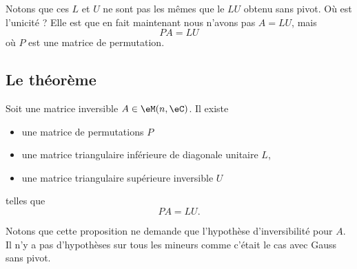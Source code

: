 Notons que ces \( L\) et \( U\) ne sont pas les mêmes que le \( L U\) obtenu sans pivot. Où est l'unicité ? Elle est que en fait maintenant nous n'avons pas \( A=LU\), mais
\begin{equation}
    PA=LU
\end{equation}
où \( P\) est une matrice de permutation.

\subsection{Le théorème}

\begin{proposition}       \label{PROPooGCPAooDrlrGu}
    Soit une matrice inversible \( A\in\eM(n,\eC)\). Il existe
    \begin{itemize}
        \item une matrice de permutations \( P\)
        \item une matrice triangulaire inférieure de diagonale unitaire \( L\),
        \item une matrice triangulaire supérieure inversible \( U\)
    \end{itemize}
    telles que
    \begin{equation}
        PA=LU.
    \end{equation}
\end{proposition}
Notons que cette proposition ne demande que l'hypothèse d'inversibilité pour \( A\). Il n'y a pas d'hypothèses sur tous les mineurs comme c'était le cas avec Gauss sans pivot.

